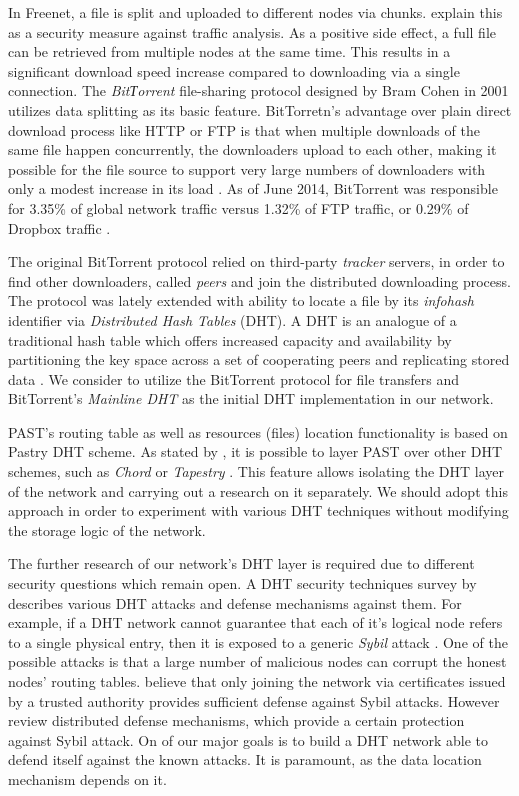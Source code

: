 In Freenet, a file is split and uploaded to different nodes via chunks.
\citet{dark-freenet} explain this as a security measure against traffic
analysis. As a positive side effect, a full file can be retrieved from
multiple nodes at the same time. This results in a significant download
speed increase compared to downloading via a single connection.
The \emph{BitТorrent} file-sharing protocol designed by Bram Cohen in 2001
\citep{bittorrent-specs} utilizes data splitting as its basic feature.
BitTorretn's advantage over plain direct download process like HTTP or FTP
is that when multiple downloads of the same file happen concurrently,
the downloaders upload to each other, making it possible for the file
source to support very large numbers of downloaders with only a modest
increase in its load \citep{bittorrent-specs}.
As of June 2014, BitTorrent was responsible for 3.35\% of global
network traffic versus 1.32\% of FTP traffic, or 0.29\% of
Dropbox traffic \citep{paloalto:traffic}.

The original BitTorrent protocol relied on third-party \emph{tracker}
servers, in order to find other downloaders, called \emph{peers} and
join the distributed downloading process.
The protocol was lately extended with ability to locate a file by
its \emph{infohash} identifier via \emph{Distributed Hash Tables} (DHT).
A DHT is an analogue of a traditional hash table which offers increased
capacity and availability by partitioning the key space across a set
of cooperating peers and replicating stored data \cite{opendht}.
We consider to utilize the BitTorrent protocol for file transfers
and BitTorrent's \emph{Mainline DHT} \citep{bittorrent-dht} as the
initial DHT implementation in our network.

PAST's routing table as well as resources (files) location functionality
is based on Pastry \citep{pastry} DHT scheme. As stated by
\citet{past}, it is possible to layer PAST over other DHT schemes,
such as \emph{Chord} \citep{chord-01} or \emph{Tapestry} \citep{tapestry}.
This feature allows isolating the DHT layer of the network and
carrying out a research on it separately. We should adopt this
approach in order to experiment with various DHT techniques without
modifying the storage logic of the network.

The further research of our network's DHT layer is required due to
different security questions which remain open.
A DHT security techniques survey by \citet{dht-security-survey}
describes various DHT attacks and defense mechanisms against them.
For example,
if a DHT network cannot guarantee that each of it's logical node
refers to a single physical entry, then it is exposed to a
generic \emph{Sybil} attack \citep{sybil}. One of the possible
attacks is that a large number of malicious nodes can corrupt the
honest nodes' routing tables.
\citet{dht-security-survey} believe that only joining the network
via certificates issued by a trusted authority provides sufficient
defense against Sybil attacks. However \citet{dht-security-survey}
review distributed defense mechanisms, which provide a certain
protection against Sybil attack.
On of our major goals is to build a DHT network able to defend itself
against the known attacks. It is paramount, as the data location
mechanism depends on it.

